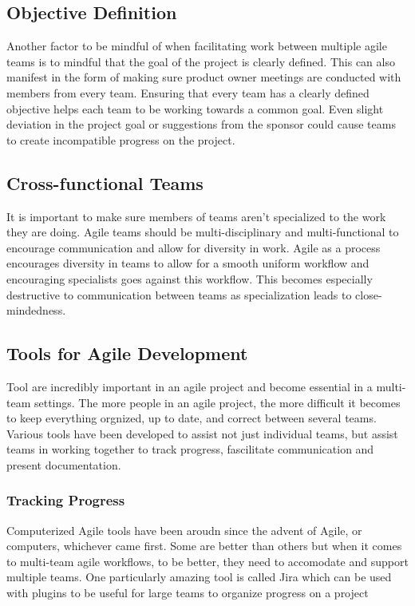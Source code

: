 \documentclass[sigplan,screen]{acmart}
\begin{document}
\subsection{Objective Definition}
Another factor to be mindful of when facilitating work between multiple agile teams is to mindful that the goal of the project is clearly defined. This can also manifest in the form of making sure product owner meetings are conducted  with members from every team. Ensuring that every team has a clearly defined objective helps each team to be working towards a common goal. Even slight deviation in the project goal or suggestions from the sponsor could cause teams to create incompatible progress on the project.

\subsection{Cross-functional Teams}
It is important to make sure members of teams aren't specialized to the work they are doing. Agile teams should be multi-disciplinary and multi-functional to encourage communication and allow for diversity in work. Agile as a process encourages diversity in teams to allow for a smooth uniform workflow and encouraging specialists goes against this workflow. This becomes especially destructive to communication between teams as specialization leads to close-mindedness.

\subsection{Tools for Agile Development}
Tool are incredibly important in an agile project and become essential in a multi-team settings. The more people in an agile project, the more difficult it becomes to keep everything orgnized, up to date, and correct between several teams. Various tools have been developed to assist not just individual teams, but assist teams in working together to track progress, fascilitate communication and present documentation.

\subsubsection{Tracking Progress}
Computerized Agile tools have been aroudn since the advent of Agile, or computers, whichever came first. Some are better than others but when it comes to multi-team agile workflows, to be better, they need to accomodate and support multiple teams. One particularly amazing tool is called Jira which can be used with plugins to be useful for large teams to organize progress on a project
\end{document}
